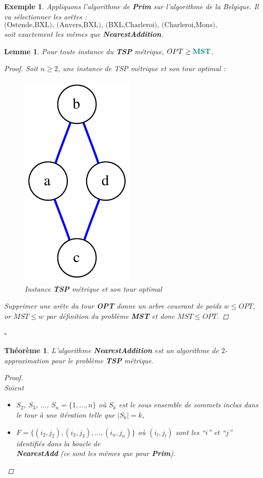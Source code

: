 \documentclass{article}
\newcommand{\titre}[1]{\textcolor{title}{#1}}
\newcommand{\cqfd}{\begin{flushright}$\square$\end{flushright}}
\newtheorem{exemple}{Exemple}[section]
\newtheorem{thm}{Th\'eor\`eme}[section]
\newtheorem{lemme}{Lemme}[section]
\newtheorem{proof}{Preuve}[section]
\begin{document}
\begin{sffamily}
\begin{exemple}
Appliquons l'algorithme de \textbf{Prim} sur l'algorithme de la Belgique.
Il va sélectionner les arêtes :
$$\text{(Ostende,BXL), (Anvers,BXL), (BXL,Charleroi), (Charleroi,Mons), (Charleroi,Liège), (Liège,Arlon)}$$
soit exactement les mêmes que \textbf{NearestAddition}.
\end{exemple}

\begin{lemme}\label{optgeqmst}
Pour toute instance du \textbf{\titre{TSP}} métrique, $OPT \geq \titre{\mathbf{MST}}$.
\begin{proof}
Soit $n\geq 2$, une instance de TSP métrique et son tour optimal :
\begin{figure}[h!]
    \begin{center}
    \includegraphics[scale=0.42]{optTSP.pdf}
    \caption{Instance \textbf{\titre{TSP}} métrique et son tour optimal}
    \end{center}
\end{figure}
Supprimer une arête du tour \textbf{OPT} donne un arbre couvrant de poids $w\leq OPT$, or $MST\leq w$ par définition du problème
\textbf{\titre{MST}} et donc $MST\leq OPT$.
\end{proof}
\cqfd
\end{lemme}

\begin{thm}
L'algorithme \textbf{NearestAddition} est un algorithme de $2$-approximation pour le problème \textbf{\titre{TSP}} métrique.
\begin{proof}$ $\\
Soient
\begin{itemize}
\item $S_2$, $S_3$, $\ldots$, $S_n=\{1,\ldots,n\}$ où $S_k$ est le sous ensemble de sommets inclus dans le tour à une itération telle que
$|S_k|=k$,
\item $F = \{ (i_2,j_2), (i_3,j_3), \ldots, (i_n,j_n)\}$ où $(i_l,j_l)$ sont les ``$i$'' et ``$j$'' identifiés dans la boucle de \\
\textbf{NearestAdd} \textit{(ce sont les mêmes que pour \textbf{Prim})}. \\
\end{itemize}


\end{proof}
\end{thm}
\end{sffamily}
\end{document}
